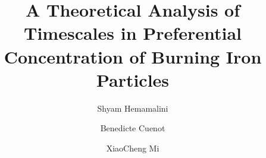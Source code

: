 \documentclass[authoryear,preprint,review,12pt]{elsarticle}
\begin{document}
\begin{frontmatter}



\title{A Theoretical Analysis of Timescales in Preferential Concentration of Burning Iron Particles}


\author[label1,label2]{Shyam Hemamalini} %
\author[label1]{Benedicte Cuenot}
\author[label1,label2]{XiaoCheng Mi}



\end{frontmatter}
\end{document}
